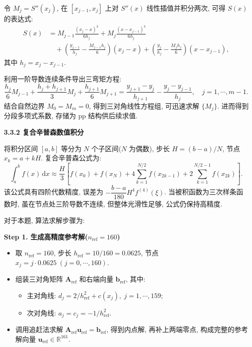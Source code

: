 \documentclass[zihao=-4,a4paper]{ctexart}
\begin{document}
令 $M_j = S''(x_j)$, 在 $[x_{j-1},x_j]$ 上对 $S''(x)$ 线性插值并积分两次, 可得 $S(x)$ 的表达式: 
\begin{equation}
    \begin{aligned}
        S(x) &= M_{j-1}\frac{(x_j-x)^3}{6h_j} + M_j\frac{(x-x_{j-1})^3}{6h_j} \\
        &\quad + \left(\frac{y_{j-1}}{h_j} - \frac{M_{j-1}h_j}{6}\right)(x_j-x) + \left(\frac{y_j}{h_j} - \frac{M_jh_j}{6}\right)(x-x_{j-1}),
    \end{aligned}
    \label{eq:spline_exp}
\end{equation}
其中 $h_j = x_j - x_{j-1}$. 

利用一阶导数连续条件导出三弯矩方程: 
\begin{equation}
    \frac{h_j}{6}M_{j-1} + \frac{h_j+h_{j+1}}{3}M_j + \frac{h_{j+1}}{6}M_{j+1} = \frac{y_{j+1}-y_j}{h_{j+1}} - \frac{y_j-y_{j-1}}{h_j},\quad j=1,\cdots,m-1.
    \label{eq:moment}
\end{equation}
结合自然边界 $M_0=M_m=0$, 得到三对角线性方程组, 可迅速求解 $\{M_j\}$. 进而得到分段多项式系数, 存储为 pp 结构供后续求值. 

\noindent\textbf{3.3.2 复合辛普森数值积分}

将积分区间 $[a,b]$ 等分为 $N$ 个子区间($N$ 为偶数), 步长 $H = (b-a)/N$, 节点 $x_k = a + kH$. 复合辛普森公式为: 
\begin{equation}
    \int_a^b f(x)\,\mathrm{d}x \approx \frac{H}{3}\left[ f(x_0) + f(x_N) + 4\sum_{k=1}^{N/2} f(x_{2k-1}) + 2\sum_{k=1}^{N/2-1} f(x_{2k}) \right].
    \label{eq:simpson}
\end{equation}
该公式具有四阶代数精度, 误差为 $-\dfrac{b-a}{180}H^4 f^{(4)}(\xi)$. 当被积函数为三次样条函数时, 虽在节点处三阶导数不连续, 但整体光滑性足够, 公式仍保持高精度. 

对于本题, 算法求解步骤为:

\textbf{Step 1. 生成高精度参考解($n_{\text{ref}}=160$)}
\begin{itemize}[rightmargin=0.5cm]
    \item 取 $n_{\text{ref}}=160$, 步长 $h_{\text{ref}} = 10/160 = 0.0625$, 节点 $x_j = j \cdot 0.0625\;(j=0,\cdots,160)$. 
    \item 组装三对角矩阵 $\bm{A}_{\text{ref}}$ 和右端向量 $\bm{b}_{\text{ref}}$, 其中: 
    \begin{itemize}
        \item 主对角线: $d_j = 2/h_{\text{ref}}^2 + c(x_j),\; j=1,\cdots,159$;
        \item 次对角线: $a_j = c_j = -1/h_{\text{ref}}^2$. 
    \end{itemize}
    \item 调用追赶法求解 $\bm{A}_{\text{ref}}\bm{u}_{\text{ref}} = \bm{b}_{\text{ref}}$, 得到内点解, 再补上两端零点, 构成完整的参考解向量 $\bm{u}_{\text{ref}}\in\mathbb{R}^{161}$. 
\end{itemize}
\end{document}
